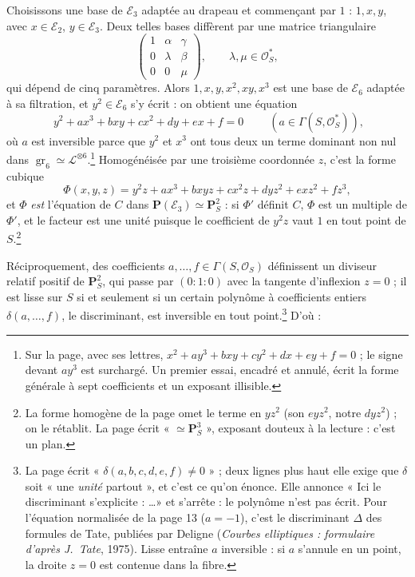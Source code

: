 \documentclass[11pt,a4paper]{article}
\begin{document}
Choisissons une base de $\mathcal{E}_3$ adaptée au drapeau et commençant par
$1$ : $1, x, y$, avec $x \in \mathcal{E}_2$, $y \in \mathcal{E}_3$. Deux telles
bases diffèrent par une matrice triangulaire
\[
\begin{pmatrix} 1 & \alpha & \gamma \\ 0 & \lambda & \beta \\ 0 & 0 & \mu
\end{pmatrix},
\qquad \lambda, \mu \in \mathcal{O}_S^*,
\]
qui dépend de cinq paramètres. Alors $1, x, y, x^2, xy, x^3$ est une base de
$\mathcal{E}_6$ adaptée à sa filtration, et $y^2 \in \mathcal{E}_6$ s'y écrit :
on obtient une équation
\[
\boxed{\;y^2 + a x^3 + b xy + c x^2 + d y + e x + f = 0\;}
\qquad (a \in \Gamma(S, \mathcal{O}_S^*)),
\]
où $a$ est inversible parce que $y^2$ et $x^3$ ont tous deux un terme dominant
non nul dans $\operatorname{gr}_6 \simeq \mathcal{L}^{\otimes 6}$.\footnote{Sur la
page, avec ses lettres, $x^2 + ay^3 + bxy + cy^2 + dx + ey + f = 0$ ; le
signe devant $ay^3$ est surchargé. Un premier essai, encadré et annulé, écrit
la forme générale à sept coefficients et un exposant illisible.} Homogénéisée
par une troisième coordonnée $z$, c'est la forme cubique
\[
\Phi(x, y, z) = y^2z + ax^3 + bxyz + cx^2z + dyz^2 + exz^2 + fz^3,
\]
et $\Phi$ \emph{est} l'équation de $C$ dans $\mathbf{P}(\mathcal{E}_3) \simeq
\mathbf{P}^2_S$ : si $\Phi'$ définit $C$, $\Phi$ est un multiple de $\Phi'$, et
le facteur est une unité puisque le coefficient de $y^2z$ vaut $1$ en tout
point de $S$.\footnote{La forme homogène de la page omet le terme en $yz^2$
(son $eyz^2$, notre $dyz^2$) ; on le rétablit. La page écrit
« $\simeq \mathbf{P}^3_S$ », exposant douteux à la lecture : c'est un plan.}

Réciproquement, des coefficients $a, \ldots, f \in \Gamma(S, \mathcal{O}_S)$
définissent un diviseur relatif positif de $\mathbf{P}^2_S$, qui passe par $(0
: 1 : 0)$ avec la tangente d'inflexion $z = 0$ ; il est lisse sur $S$ si et
seulement si un certain polynôme à coefficients entiers $\delta(a, \ldots, f)$,
le discriminant, est inversible en tout point.\footnote{La page écrit
« $\delta(a, b, c, d, e, f) \neq 0$ » ; deux lignes plus haut elle exige que
$\delta$ soit « une \emph{unité} partout », et c'est ce qu'on énonce. Elle
annonce « Ici le discriminant s'explicite : \ldots » et s'arrête : le polynôme
n'est pas écrit. Pour l'équation normalisée de la page 13 ($a = -1$), c'est le
discriminant $\Delta$ des formules de Tate, publiées par Deligne
(\emph{Courbes elliptiques : formulaire d'après J.~Tate}, 1975). Lisse
entraîne $a$ inversible : si $a$ s'annule en un point, la droite $z = 0$ est
contenue dans la fibre.} D'où :
\end{document}

